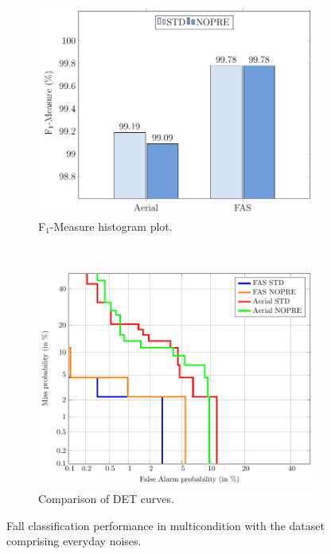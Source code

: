 \begin{figure}[t]
	\centering
	\begin{subfigure}[b]{0.6\textwidth}
		\includegraphics[width=\textwidth]{img/winr2016/pgfsource/8_bck_multicondition/BAR_8_bck_multicondition.pdf}
		\caption{F$_1$-Measure histogram plot.}\label{fig:multi_bck_BAR}	
	\end{subfigure}
	~
	\begin{subfigure}[b]{0.6\textwidth}
		\includegraphics[width=\textwidth]{img/winr2016/matlab2tikz/8_bck_multicondition/DET_8_bck_multicondition.pdf}
		\caption{Comparison of DET curves.}\label{fig:multi_bck_DET}	
	\end{subfigure}
	\caption{Fall classification performance in multicondition with the dataset comprising everyday noises.}\label{fig:multi_bck}
	\vspace{-0.25cm}
\end{figure}

